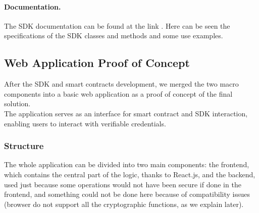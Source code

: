 \paragraph{Documentation.}
The SDK documentation can be found at the link
\href{https://matteocasonato.gitbook.io/ssikit-sdk/}
{}. Here can be seen the 
specifications of the SDK classes and methods and some use examples.

\subsection{Web Application Proof of Concept}
After the SDK and smart contracts development, we merged the two macro components 
into a basic web application as a proof of concept of the final solution.\\
The application serves as an interface for smart contract and SDK interaction, 
enabling users to interact with verifiable credentials.

\subsubsection{Structure}
The whole application can be divided into two main components: the frontend, which
contains the central part of the logic, thanks to React.js, and the backend, used 
just because some operations would not have been secure if done in the frontend, and 
something could not be done here because of compatibility issues (browser do not 
support all the cryptographic functions, as we explain later).

